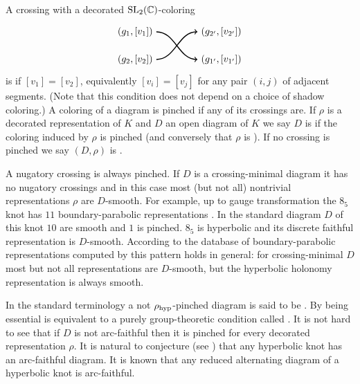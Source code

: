 \documentclass[margincite, leqno]{sl2art}
\numberwithin{equation}{section}
\begin{document}
\begin{definition}
  A crossing with a decorated \(\operatorname{SL}_2(\mathbb{C})\)-coloring
  \[
    \begin{tikzpicture}[line width=1, baseline=30, scale=1]
      \draw[->] (0,0) node[left] {\((g_{2}, [v_{2}])\)} \br (1.5,1)
      node[right] {\((g_{2'}, [v_{2'}])\)};
      \draw[->] (0,1) node[left] {\((g_{1}, [v_{1}])\)} \br (1.5,0)
      node[right] {\((g_{1'}, [v_{1'}])\)};
    \end{tikzpicture}
  \]
  is  if \([v_{1}] = [v_{2}]\), equivalently
  \([v_{i}] = [v_{j}]\) for any pair \((i,j)\) of adjacent segments.
  (Note that this condition does not depend on a choice of shadow coloring.)
  A coloring of a diagram is pinched if any of its crossings are.
  If \(\rho\) is a decorated representation of \(K\) and \(D\) an
  open diagram of \(K\) we say \(D\) is  
  if the coloring induced by \(\rho\) is pinched (and conversely that
  \(\rho\) is  ).
  If no crossing is pinched we say \((D, \rho)\) is .
\end{definition}

A nugatory crossing is always pinched.
If \(D\) is a crossing-minimal diagram it has no nugatory crossings
and in this case most (but not all) nontrivial representations
\(\rho\) are \(D\)-smooth.
For example, up to gauge transformation the \(8_{5}\) knot has \(11\)
boundary-parabolic representations \cite{Kim2018}.
In the standard diagram \(D\) \cite[Figure 28]{Kim2018} of this knot
\(10\) are smooth and \(1\) is pinched.
\(8_{5}\) is hyperbolic and its discrete faithful representation is
\(D\)-smooth.
According to the database of boundary-parabolic representations computed by
\citeauthor{DiagramSite} \cite{DiagramSite} this pattern holds in general:
for crossing-minimal \(D\) most but not all representations are
\(D\)-smooth, but the hyperbolic holonomy representation is always smooth.

In the standard terminology a not \(\rho_{\operatorname{hyp}}\)-pinched diagram is
said to be .%
By \cite[Theorem
3]{McphailSnyder2024octahedralcoordinateswirtingerpresentation} being
essential is equivalent to a purely group-theoretic condition called
.
It is not hard to see that if \(D\) is not arc-faithful then it is
pinched for every decorated representation \(\rho\).
It is natural to conjecture (see \cite[Section
5]{McphailSnyder2024octahedralcoordinateswirtingerpresentation}) that
any hyperbolic knot has an arc-faithful diagram.
It is known that any reduced alternating diagram of a hyperbolic knot
is arc-faithful.
\end{document}
